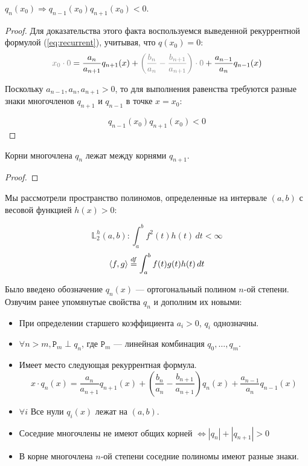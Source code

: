\documentclass[12pt]{article}
\begin{document}
		\begin{state}
			$q_n(x_0) \Rightarrow q_{n-1}(x_0) q_{n+1}(x_0) < 0$.
			\begin{proof}
				Для доказательства этого факта воспользуемся выведенной рекуррентной формулой (\ref{eq:recurrent}), учитывая, что $q(x_0) = 0$:
				$$ {\color{gray}x_0 \cdot 0} = 
				\frac{a_n}{a_{n+1}} q_{n+1}(x) + {\color{gray}\left(\frac{b_n}{a_n} - 
				\frac{b_{n+1}}{a_{n+1}}\right) \cdot 0} + \frac{a_{n-1}}{a_n} q_{n-1}(x)$$

				Поскольку $a_{n-1}, a_n, a_{n+1} > 0$, то для выполнения равенства требуются разные знаки многочленов $q_{n+1}$ и $q_{n-1}$ в точке $x=x_0$:

				$$q_{n-1}(x_0) q_{n+1}(x_0) < 0$$
			\end{proof}
		\end{state}

		\begin{state}
			Корни многочлена $q_n$ лежат между корнями $q_{n+1}$.
			\begin{proof}
			\end{proof}
		\end{state}


		Мы рассмотрели пространство полиномов, определенные на интервале $(a, b)$ с весовой функцией $h(x) > 0$:

		$$\mathbb{L}_2^h (a, b): \int_a^b f^2(t) h(t) \,dt < \infty$$
		$$\left\langle f, g \right\rangle \overset{df}{=} \int_a^b f(t) g(t) h(t) \,dt$$
	
		Было введено обозначение $q_n(x)$ --- ортогональный полином $n$-ой степени. Озвучим ранее упомянутые
		свойства $q_n$ и дополним их новыми:

		\begin{itemize}
			\item При определении старшего коэффициента $a_i > 0$, $q_i$ однозначны.
			\item $\forall n > m, \mathtt{P}_m \perp q_n$, где $\mathtt{P}_m$ --- линейная комбинация $q_0, \dots , q_m$.
			\item Имеет место следующая рекуррентная формула.
			$$x \cdot q_n(x) = 
			\frac{a_n}{a_{n+1}} q_{n+1}(x) + (\frac{b_n}{a_n} - \frac{b_{n+1}}{a_{n+1}}) q_n(x) + \frac{a_{n-1}}{a_n} q_{n-1}(x)$$
			\item $\forall i$ Все нули $q_i(x)$ лежат на $(a, b)$.
			\item Соседние многочлены не имеют общих корней $\Leftrightarrow |q_n| + |q_{n+1}| > 0$
			\item В корне многочлена $n$-ой степени соседние полиномы имеют разные знаки.
		\end{itemize}
\end{document}
